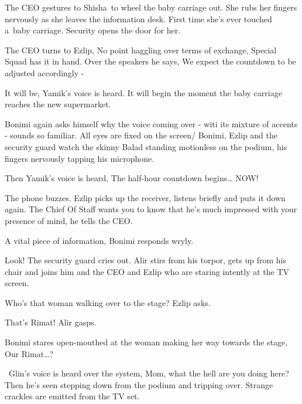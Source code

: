\documentclass[letterpaper]{article}
\begin{document}
The CEO gestures to Shisha~to wheel the baby carriage out. She rubs her fingers nervously as she leaves the information
desk. First time she's ever touched a~baby carriage. Security opens the door for her.

The CEO turns to Ezlip, {\textquotedbl}No point haggling over terms of exchange, Special Squad has it in
hand.{\textquotedbl} Over the speakers he says, {\textquotedbl}We expect the countdown to be adjusted accordingly
-{\textquotedbl} 

{\textquotedbl}It will be,{\textquotedbl} Yamik's voice is heard.{\textquotedbl} It will begin the moment the baby
carriage reaches\textcolor[rgb]{0.0,0.4392157,0.7529412}{ }the new supermarket.{\textquotedbl} 

Bonimi again asks himself why the voice coming over - witi its mixture of accents - sounds
so\textcolor[rgb]{0.0,0.4392157,0.7529412}{ }familiar. All eyes are fixed on the
screen\textcolor[rgb]{0.0,0.4392157,0.7529412}{/ }Bonimi, Ezlip and the security guard watch the skinny Balad standing
motionless on the podium, his fingers nervously tapping his microphone.

Then Yamik's voice is heard, {\textquotedbl}The half-hour countdown
begins{\dots}\textcolor[rgb]{0.0,0.4392157,0.7529412}{ }NOW!{\textquotedbl}

The phone buzzes. Ezlip picks up the receiver, listens briefly and puts it down again. {\textquotedbl}The Chief Of Staff
wants you to know that he's much impressed with your presence of mind,{\textquotedbl} he tells the CEO.

{\textquotedbl}A vital piece of information,{\textquotedbl} Bonimi responds wryly. 

{\textquotedbl}Look!{\textquotedbl} The security guard cries out. Alir stirs from his torpor, gets up from his chair and
joins him and the CEO and Ezlip who are staring intently at the TV screen. 

{\textquotedbl}Who's that woman walking over to the stage?{\textquotedbl} Ezlip asks. 

{\textquotedbl}That's Rimat!{\textquotedbl} Alir gasps. 

Bonimi stares open-mouthed at the woman making her way towards the stage, {\textquotedbl}Our
Rimat{\dots}?{\textquotedbl}

~Glin's voice is heard over the system, {\textquotedbl}Mom, what the hell are you doing here?{\textquotedbl} Then
he\textcolor[rgb]{0.0,0.4392157,0.7529412}{{}'}s seen stepping down from the podium and tripping over. Strange crackles
are emitted from the TV set.
\end{document}

